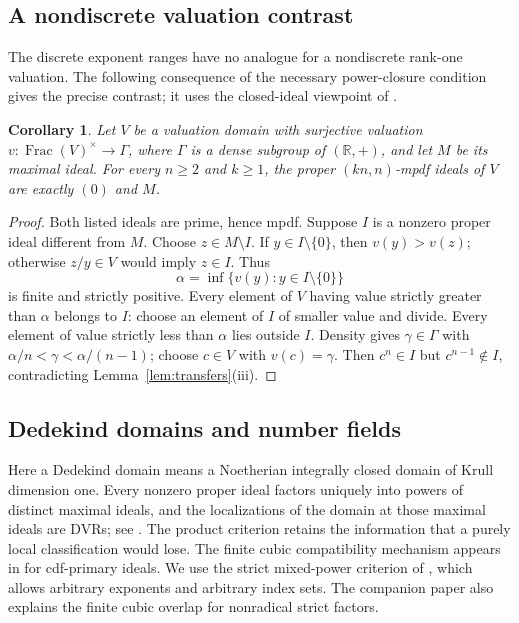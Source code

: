 \documentclass[11pt,a4paper]{amsart}
\newtheorem{corollary}[theorem]{Corollary}
\theoremstyle{definition}
\theoremstyle{remark}
\numberwithin{equation}{section}
\begin{document}
\subsection{A nondiscrete valuation contrast}

The discrete exponent ranges have no analogue for a nondiscrete rank-one
valuation. The following consequence of the necessary power-closure
condition gives the precise contrast; it uses the closed-ideal viewpoint
of \cite{ABclosed}.

\begin{corollary}\label{cor:nondiscrete-valuation}
Let $V$ be a valuation domain with surjective valuation
$v:\operatorname{Frac}(V)^\times\to\Gamma$, where $\Gamma$ is a dense
subgroup of $(\mathbb R,+)$, and let $M$ be its maximal ideal.
For every $n\ge2$ and $k\ge1$, the proper $(kn,n)$-mpdf ideals of $V$
are exactly $(0)$ and $M$.
\end{corollary}
\begin{proof}
Both listed ideals are prime, hence mpdf. Suppose $I$ is a nonzero
proper ideal different from $M$. Choose $z\in M\setminus I$.
If $y\in I\setminus\{0\}$, then $v(y)>v(z)$; otherwise
$z/y\in V$ would imply $z\in I$. Thus
\[
 \alpha=\inf\{v(y):y\in I\setminus\{0\}\}
\]
is finite and strictly positive. Every element of $V$ having value
strictly greater than $\alpha$ belongs to $I$: choose an element of
$I$ of smaller value and divide. Every element of value strictly less
than $\alpha$ lies outside $I$. Density gives $\gamma\in\Gamma$ with
$\alpha/n<\gamma<\alpha/(n-1)$; choose $c\in V$ with $v(c)=\gamma$.
Then $c^n\in I$ but $c^{n-1}\notin I$, contradicting
Lemma~\ref{lem:transfers}(iii).
\end{proof}

\subsection{Dedekind domains and number fields}

Here a Dedekind domain means a Noetherian integrally closed domain
of Krull dimension one. Every nonzero proper ideal factors uniquely
into powers of distinct maximal ideals, and the localizations of the
domain at those maximal ideals are DVRs; see \cite[Chapter~9]{AM}.
The product criterion retains the information that a purely local
classification would lose.
The finite cubic compatibility mechanism appears in
\cite[Propositions~14 and~15]{YSO} for cdf-primary ideals.
We use the strict mixed-power criterion of \cite{TS}, which allows
arbitrary exponents and arbitrary index sets. The companion paper
also explains the finite cubic overlap for nonradical strict factors.
\end{document}
